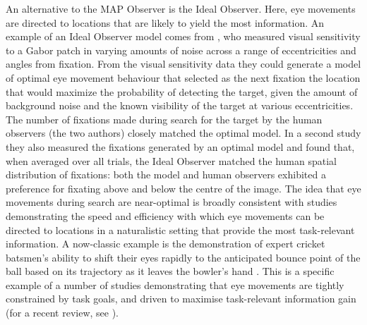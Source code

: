\documentclass[man]{apa6}
\begin{document}
An alternative to the MAP Observer is the Ideal Observer. Here, eye movements are directed to locations that are likely to yield the most information. An example of an Ideal Observer model comes from \textcite{najemnik-geisler2005}, who measured visual sensitivity to a Gabor patch in varying amounts of noise across a range of eccentricities and angles from fixation. From the visual sensitivity data they could generate a model of optimal eye movement behaviour that selected as the next fixation the location that would maximize the probability of detecting the target, given the amount of background noise and the known visibility of the target at various eccentricities. The number of fixations made during search for the target by the human observers (the two authors) closely matched the optimal model. In a second study \parencite{najemnik-geisler2008} they also measured the fixations generated by an optimal model and found that, when averaged over all trials, the Ideal Observer matched the human spatial distribution of fixations: both the model and human observers exhibited a preference for fixating above and below the centre of the image. The idea that eye movements during search are near-optimal is broadly consistent with studies demonstrating the speed and efficiency with which eye movements can be directed to locations in a naturalistic setting that provide the most task-relevant information. A now-classic example is the demonstration of expert cricket batsmen's ability to shift their eyes rapidly to the anticipated bounce point of the ball based on its trajectory as it leaves the bowler's hand \parencite{land2000}. This is a specific example of a number of studies demonstrating that eye movements are tightly constrained by task goals, and driven to maximise task-relevant information gain (for a recent review, see \textcite{hayhoe2014}). 
\end{document}
